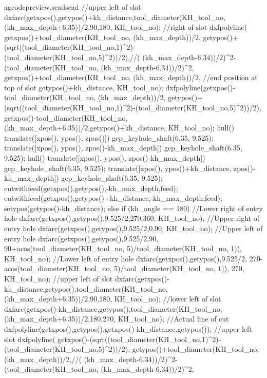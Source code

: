 \documentclass{ltxdoc}
\begin{document}
\begin{writecode}{a}{gcodepreview.scad}{scad}
{    //upper left of slot
    dxfarc(getxpos(),getypos()+kh_distance,tool_diameter(KH_tool_no, (kh_max_depth+6.35))/2,90,180, KH_tool_no);
    //right of slot
    dxfpolyline(
        getxpos()+tool_diameter(KH_tool_no, (kh_max_depth))/2, 
        getypos()+(sqrt((tool_diameter(KH_tool_no,1)^2)-(tool_diameter(KH_tool_no,5)^2))/2),//( (kh_max_depth-6.34))/2)^2-(tool_diameter(KH_tool_no, (kh_max_depth-6.34))/2)^2,
        getxpos()+tool_diameter(KH_tool_no, (kh_max_depth))/2,
    //end position at top of slot
        getypos()+kh_distance, 
        KH_tool_no);
    dxfpolyline(getxpos()-tool_diameter(KH_tool_no, (kh_max_depth))/2, getypos()+(sqrt((tool_diameter(KH_tool_no,1)^2)-(tool_diameter(KH_tool_no,5)^2))/2), getxpos()-tool_diameter(KH_tool_no, (kh_max_depth+6.35))/2,getypos()+kh_distance, KH_tool_no);
    hull(){
      translate([xpos(), ypos(), zpos()]){
        gcp_keyhole_shaft(6.35, 9.525);
      }
      translate([xpos(), ypos(), zpos()-kh_max_depth]){
        gcp_keyhole_shaft(6.35, 9.525);
      }
    }
    hull(){
      translate([xpos(), ypos(), zpos()-kh_max_depth]){
        gcp_keyhole_shaft(6.35, 9.525);
      }
      translate([xpos(), ypos()+kh_distance, zpos()-kh_max_depth]){
        gcp_keyhole_shaft(6.35, 9.525);
      }
    }
    cutwithfeed(getxpos(),getypos(),-kh_max_depth,feed);
    cutwithfeed(getxpos(),getypos()+kh_distance,-kh_max_depth,feed);
    setypos(getypos()-kh_distance);
  } else if (kh_angle == 180) {
    //Lower right of entry hole
    dxfarc(getxpos(),getypos(),9.525/2,270,360, KH_tool_no);
    //Upper right of entry hole
    dxfarc(getxpos(),getypos(),9.525/2,0,90, KH_tool_no);
    //Upper left of entry hole
    dxfarc(getxpos(),getypos(),9.525/2,90, 90+acos(tool_diameter(KH_tool_no, 5)/tool_diameter(KH_tool_no, 1)), KH_tool_no);
    //Lower left of entry hole
    dxfarc(getxpos(),getypos(),9.525/2, 270-acos(tool_diameter(KH_tool_no, 5)/tool_diameter(KH_tool_no, 1)), 270, KH_tool_no);
    //upper left of slot
    dxfarc(getxpos()-kh_distance,getypos(),tool_diameter(KH_tool_no, (kh_max_depth+6.35))/2,90,180, KH_tool_no);
    //lower left of slot
    dxfarc(getxpos()-kh_distance,getypos(),tool_diameter(KH_tool_no, (kh_max_depth+6.35))/2,180,270, KH_tool_no);
    //Actual line of cut
    dxfpolyline(getxpos(),getypos(),getxpos()-kh_distance,getypos());
    //upper left slot
    dxfpolyline(
        getxpos()-(sqrt((tool_diameter(KH_tool_no,1)^2)-(tool_diameter(KH_tool_no,5)^2))/2), 
        getypos()+tool_diameter(KH_tool_no, (kh_max_depth))/2,//( (kh_max_depth-6.34))/2)^2-(tool_diameter(KH_tool_no, (kh_max_depth-6.34))/2)^2,
}
\end{writecode}
\end{document}
